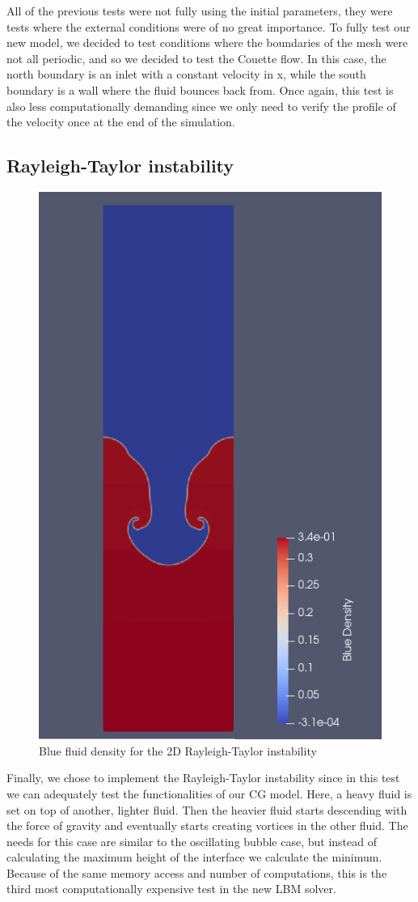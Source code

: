 \documentclass[12pt]{book}
\begin{document}
All of the previous tests were not fully using the initial parameters, they were tests where the external conditions were of no great importance. To fully test our new model, we decided to test conditions where the boundaries of the mesh were not all periodic, and so we decided to test the Couette flow. In this case, the north boundary is an inlet with a constant velocity in x, while the south boundary is a wall where the fluid bounces back from. Once again, this test is also less computationally demanding since we only need to verify the profile of the velocity once at the end of the simulation. 

\subsection{Rayleigh-Taylor instability}
\begin{figure}[H]
	\centering
	\includegraphics[width=0.5\linewidth]{Resources/Images/rt.png}
	\caption{Blue fluid density for the 2D Rayleigh-Taylor instability}
	\label{fig:rt}
\end{figure}
Finally, we chose to implement the Rayleigh-Taylor instability since in this test we can adequately test the functionalities of our CG model. Here, a heavy fluid is set on top of another, lighter fluid. Then the heavier fluid starts descending with the force of gravity and eventually starts creating vortices in the other fluid. The needs for this case are similar to the oscillating bubble case, but instead of calculating the maximum height of the interface we calculate the minimum. Because of the same memory access and number of computations, this is the third most computationally expensive test in the new LBM solver.
\end{document}
